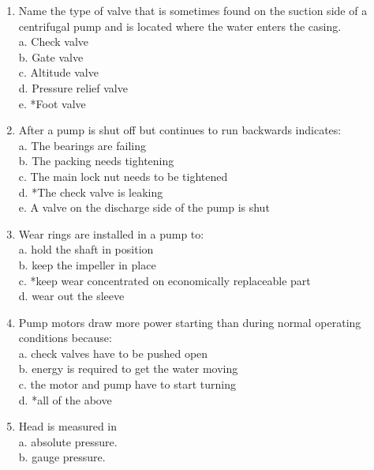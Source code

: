 
\begin{enumerate}[1.]
\item Name the type of valve that is sometimes found on the suction side of a centrifugal pump and is located where the water enters the casing.\\
a. Check valve\\
b. Gate valve\\
c. Altitude valve\\
d. Pressure relief valve\\
e. *Foot valve\\
\item After a pump is shut off but continues to run backwards indicates:\\
a. The bearings are failing\\
b. The packing needs tightening\\
c. The main lock nut needs to be tightened\\
d. *The check valve is leaking\\
e. A valve on the discharge side of the pump is shut\\
\item Wear rings are installed in a pump to:\\
a. hold the shaft in position\\
b. keep the impeller in place\\
c. *keep wear concentrated on economically replaceable part\\
d. wear out the sleeve\\
\item Pump motors draw more power starting than during normal operating conditions because:\\
a. check valves have to be pushed open\\
b. energy is required to get the water moving\\
c. the motor and pump have to start turning\\
d. *all of the above\\
\item Head is measured in\\
a. absolute pressure.\\
b. gauge pressure.\\

\end{enumerate}
